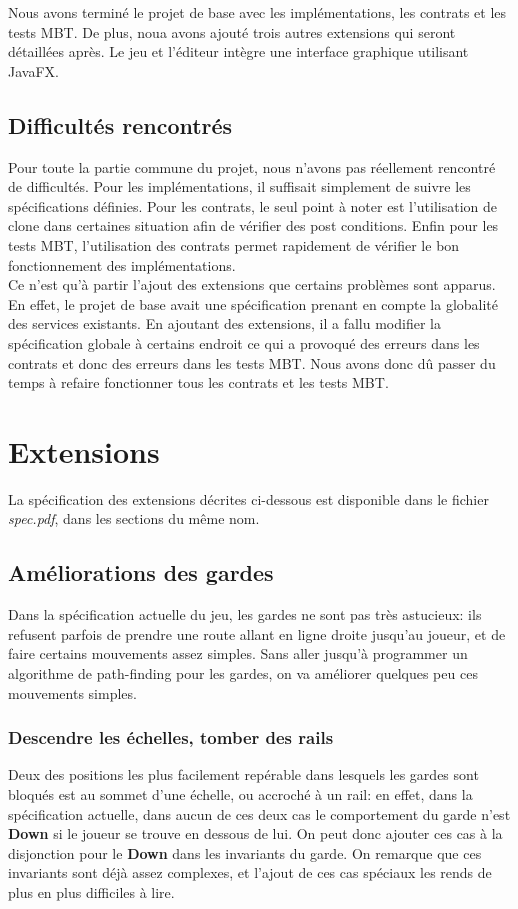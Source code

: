 \documentclass{article}
\begin{document}
Nous avons terminé le projet de base avec les implémentations, les contrats et les tests MBT. De plus, noua avons ajouté trois autres extensions qui seront détaillées après. Le jeu et l'éditeur intègre une interface graphique utilisant JavaFX.

\subsection{Difficultés rencontrés}

Pour toute la partie commune du projet, nous n'avons pas réellement rencontré de difficultés. Pour les implémentations, il suffisait simplement de suivre les spécifications définies. Pour les contrats, le seul point à noter est l'utilisation de clone dans certaines situation  afin de vérifier des post conditions. Enfin pour les tests MBT, l'utilisation des contrats permet rapidement de vérifier le bon fonctionnement des implémentations.\\

Ce n'est qu'à partir l'ajout des extensions que certains problèmes sont apparus. En effet, le projet de base avait une spécification prenant en compte la globalité des services existants. En ajoutant des extensions, il a fallu modifier la spécification globale à certains endroit ce qui a provoqué des erreurs dans les contrats et donc des erreurs dans les tests MBT. Nous avons donc dû passer du temps à refaire fonctionner tous les contrats et les tests MBT.

\section{Extensions}
La spécification des extensions décrites ci-dessous est disponible dans le fichier \textit{spec.pdf}, dans les sections du même nom.

\subsection{Améliorations des gardes}
Dans la spécification actuelle du jeu, les gardes ne sont pas très astucieux: ils refusent parfois de prendre une route allant en ligne droite jusqu'au joueur, et de faire certains mouvements assez simples. Sans aller jusqu'à programmer un algorithme de path-finding pour les gardes, on va améliorer quelques peu ces mouvements simples.

\subsubsection{Descendre les échelles, tomber des rails}
Deux des positions les plus facilement repérable dans lesquels les gardes sont bloqués est au sommet d'une échelle, ou accroché à un rail: en effet, dans la spécification actuelle, dans aucun de ces deux cas le comportement du garde n'est \textbf{Down} si le joueur se trouve en dessous de lui. On peut donc ajouter ces cas à la disjonction pour le \textbf{Down} dans les invariants du garde. On remarque que ces invariants sont déjà assez complexes, et l'ajout de ces cas spéciaux les rends de plus en plus difficiles à lire.
\end{document}
